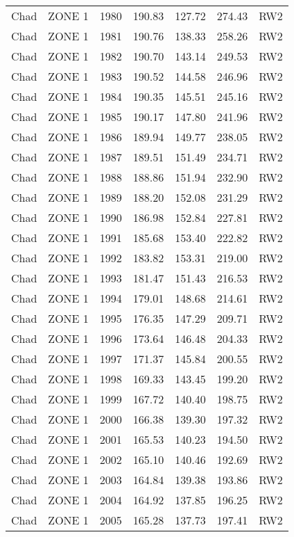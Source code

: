 \begin{longtable}{lllrrrl}
  Chad & ZONE 1 & 1980 & 190.83 & 127.72 & 274.43 & RW2 \\ 
  Chad & ZONE 1 & 1981 & 190.76 & 138.33 & 258.26 & RW2 \\ 
  Chad & ZONE 1 & 1982 & 190.70 & 143.14 & 249.53 & RW2 \\ 
  Chad & ZONE 1 & 1983 & 190.52 & 144.58 & 246.96 & RW2 \\ 
  Chad & ZONE 1 & 1984 & 190.35 & 145.51 & 245.16 & RW2 \\ 
  Chad & ZONE 1 & 1985 & 190.17 & 147.80 & 241.96 & RW2 \\ 
  Chad & ZONE 1 & 1986 & 189.94 & 149.77 & 238.05 & RW2 \\ 
  Chad & ZONE 1 & 1987 & 189.51 & 151.49 & 234.71 & RW2 \\ 
  Chad & ZONE 1 & 1988 & 188.86 & 151.94 & 232.90 & RW2 \\ 
  Chad & ZONE 1 & 1989 & 188.20 & 152.08 & 231.29 & RW2 \\ 
  Chad & ZONE 1 & 1990 & 186.98 & 152.84 & 227.81 & RW2 \\ 
  Chad & ZONE 1 & 1991 & 185.68 & 153.40 & 222.82 & RW2 \\ 
  Chad & ZONE 1 & 1992 & 183.82 & 153.31 & 219.00 & RW2 \\ 
  Chad & ZONE 1 & 1993 & 181.47 & 151.43 & 216.53 & RW2 \\ 
  Chad & ZONE 1 & 1994 & 179.01 & 148.68 & 214.61 & RW2 \\ 
  Chad & ZONE 1 & 1995 & 176.35 & 147.29 & 209.71 & RW2 \\ 
  Chad & ZONE 1 & 1996 & 173.64 & 146.48 & 204.33 & RW2 \\ 
  Chad & ZONE 1 & 1997 & 171.37 & 145.84 & 200.55 & RW2 \\ 
  Chad & ZONE 1 & 1998 & 169.33 & 143.45 & 199.20 & RW2 \\ 
  Chad & ZONE 1 & 1999 & 167.72 & 140.40 & 198.75 & RW2 \\ 
  Chad & ZONE 1 & 2000 & 166.38 & 139.30 & 197.32 & RW2 \\ 
  Chad & ZONE 1 & 2001 & 165.53 & 140.23 & 194.50 & RW2 \\ 
  Chad & ZONE 1 & 2002 & 165.10 & 140.46 & 192.69 & RW2 \\ 
  Chad & ZONE 1 & 2003 & 164.84 & 139.38 & 193.86 & RW2 \\ 
  Chad & ZONE 1 & 2004 & 164.92 & 137.85 & 196.25 & RW2 \\ 
  Chad & ZONE 1 & 2005 & 165.28 & 137.73 & 197.41 & RW2 \\ 

\end{longtable}
